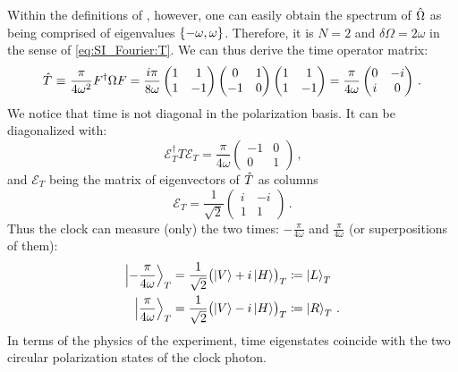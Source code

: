 Within the definitions of \citereset\cite{Moreva:illustration}, however,
one can easily obtain
the spectrum of $\hat{\Omega}$
as being comprised of eigenvalues
$\qty{-\omega, \omega}$.
Therefore, it is $N=2$ and $\delta\Omega = 2\omega$ in the sense of
\eqref{eq:SI_Fourier:T}.
We can thus derive the time operator matrix:
\begin{equation}
  \hat{T}
  \operatorname*{\,\equiv\,}
  \frac{\pi}{4\omega^2} F^{\dagger} \Omega F
  =
  \frac{i\pi}{8\omega}
  \begin{pmatrix}
    1 & 1 \\
    1 & -1
  \end{pmatrix}
  \begin{pmatrix}
    0 & 1 \\
   -1 & 0
  \end{pmatrix}
  \begin{pmatrix}
    1 & 1 \\
    1 & -1
  \end{pmatrix}
  =
  \frac{\pi}{4\omega}
  \begin{pmatrix}
    0 & -i \\
    i &  0
  \end{pmatrix}
  \,\text{.}
\end{equation}
We notice that time is not diagonal in the polarization basis.
It can be diagonalized with:
\begin{equation}\label{eq:moreva_diag_T}
  \mathcal{E}_T^{\dagger} T \mathcal{E}_T
  =
\frac{\pi}{4\omega}
\begin{pmatrix}
  -1  & 0 \\
  0   & 1
\end{pmatrix}
\,\text{,}
\end{equation}
and $\mathcal{E}_T$ being the matrix of eigenvectors of $\hat{T}$ as columns
\begin{equation}
  \mathcal{E}_T
  =
  \frac{1}{\sqrt{2}}
  \begin{pmatrix}
    i & -i \\
    1 & 1
  \end{pmatrix}
  \,\text{.}
\end{equation}
Thus the clock can measure (only) the two times: $-\frac{\pi}{4\omega}$ and $\frac{\pi}{4\omega}$
(or superpositions of them):
\begin{align}
  \ket{-\frac{\pi}{4\omega}}_T &= \frac{1}{\sqrt{2}} \qty\big(\ket{V}+i\ket{H})_T \coloneqq \ket{L}_T \\
  \ket{ \frac{\pi}{4\omega}}_T &= \frac{1}{\sqrt{2}} \qty\big(\ket{V}-i\ket{H})_T \coloneqq \ket{R}_T \, \text{.}
\end{align}
In terms of the physics of the experiment,
time eigenstates coincide with
the two circular polarization states of the clock photon.

